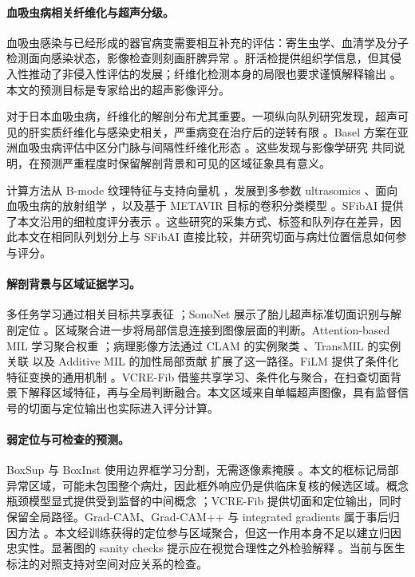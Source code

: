 \paragraph{血吸虫病相关纤维化与超声分级。}
血吸虫感染与已经形成的器官病变需要相互补充的评估：寄生虫学、血清学及分子检测面向感染状态，影像检查则刻画肝脾异常 \citep{weerakoon2015diagnosis,sah2015imaging}。肝活检提供组织学信息，但其侵入性推动了非侵入性评估的发展；纤维化检测本身的局限也要求谨慎解释输出 \citep{bravo2001biopsy,patel2020limitations}。本文的预测目标是专家给出的超声影像评分。

对于日本血吸虫病，纤维化的解剖分布尤其重要。一项纵向队列研究发现，超声可见的肝实质纤维化与感染史相关，严重病变在治疗后的逆转有限 \citep{carlton2010morbidity}。Basel 方案在亚洲血吸虫病评估中区分门脉与间隔性纤维化形态 \citep{richter2025basel}。这些发现与影像学研究 \citep{sah2015imaging} 共同说明，在预测严重程度时保留解剖背景和可见的区域征象具有意义。

计算方法从 B-mode 纹理特征与支持向量机 \citep{yeh2003fibrosis}，发展到多参数 ultrasomics \citep{li2019ultrasomics}、面向血吸虫病的放射组学 \citep{guo2024radiomics}，以及基于 METAVIR 目标的卷积分类模型 \citep{lee2020ultrasound}。SFibAI 提供了本文沿用的细粒度评分表示 \citep{xu2026sfibai}。这些研究的采集方式、标签和队列存在差异，因此本文在相同队列划分上与 SFibAI 直接比较，并研究切面与病灶位置信息如何参与评分。

\paragraph{解剖背景与区域证据学习。}
多任务学习通过相关目标共享表征 \citep{caruana1997multitask}；SonoNet 展示了胎儿超声标准切面识别与解剖定位 \citep{baumgartner2017sononet}。区域聚合进一步将局部信息连接到图像层面的判断。Attention-based MIL 学习聚合权重 \citep{ilse2018attention}；病理影像方法通过 CLAM 的实例聚类 \citep{lu2021clam}、TransMIL 的实例关联 \citep{shao2021transmil} 以及 Additive MIL 的加性局部贡献 \citep{javed2022additive} 扩展了这一路径。FiLM 提供了条件化特征变换的通用机制 \citep{perez2018film}。VCRE-Fib 借鉴共享学习、条件化与聚合，在扫查切面背景下解释区域特征，再与全局判断融合。本文区域来自单幅超声图像，具有监督信号的切面与定位输出也实际进入评分计算。

\paragraph{弱定位与可检查的预测。}
BoxSup 与 BoxInst 使用边界框学习分割，无需逐像素掩膜 \citep{dai2015boxsup,tian2021boxinst}。本文的框标记局部异常区域，可能未包围整个病灶，因此框外响应仍是供临床复核的候选区域。概念瓶颈模型显式提供受到监督的中间概念 \citep{koh2020concept}；VCRE-Fib 提供切面和定位输出，同时保留全局路径。Grad-CAM、Grad-CAM++ 与 integrated gradients 属于事后归因方法 \citep{selvaraju2017gradcam,chattopadhay2018gradcampp,sundararajan2017axiomatic}。本文经训练获得的定位参与区域聚合，但这一作用本身不足以建立归因忠实性。显著图的 sanity checks 提示应在视觉合理性之外检验解释 \citep{adebayo2018sanity}。当前与医生标注的对照支持对空间对应关系的检查。

